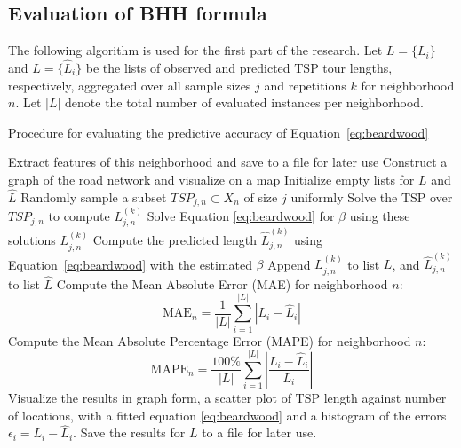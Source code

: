 \subsection{Evaluation of BHH formula}
The following algorithm is used for the first part of the research.
Let \( L = \{L_i\} \) and \( \hat{L} = \{\hat{L}_i\} \) be the lists of observed and predicted TSP tour lengths,
respectively, aggregated over all sample sizes \( j \) and repetitions \( k \) for neighborhood \( n \).
Let \( |L| \) denote the total number of evaluated instances per neighborhood.
\begin{algorithm}[H]
	\caption{Procedure for evaluating the predictive accuracy of Equation~\ref{eq:beardwood}}
	\label{alg:evaluation}
	\begin{algorithmic}[1]
		\State Extract features of this neighborhood and save to a file for later use
		\State Construct a graph of the road network and visualize on a map
		\State Initialize empty lists for \( L \) and \( \hat{L} \)
		\State Randomly sample a subset \( TSP_{j,n} \subset X_n \) of size \( j \) uniformly
		\State Solve the TSP over \( TSP_{j,n} \) to compute \( L_{j,n}^{(k)} \)
		\State Solve Equation \ref{eq:beardwood} for $\beta$ using these solutions \(L_{j,n}^{(k)}\)
		\State Compute the predicted length \( \hat{L}_{j,n}^{(k)} \) using Equation~\ref{eq:beardwood} with the estimated $\beta$
		\State Append \( L_{j,n}^{(k)} \) to list \( L \), and \( \hat{L}_{j,n}^{(k)} \) to list \( \hat{L} \)
		\EndFor
		\EndFor
		\State Compute the Mean Absolute Error (MAE) for neighborhood \( n \):
		\[
			\text{MAE}_n = \frac{1}{|L|} \sum_{i=1}^{|L|} \left| L_i - \hat{L}_i \right|
		\]
		\State Compute the Mean Absolute Percentage Error (MAPE) for neighborhood \( n \):
		\[
			\text{MAPE}_n = \frac{100\%}{|L|} \sum_{i=1}^{|L|} \left| \frac{L_i - \hat{L}_i}{L_i} \right|
		\]
		\State Visualize the results in graph form, a scatter plot of TSP length against number of locations, with
		a fitted equation \ref{eq:beardwood} and a histogram of the errors $\epsilon_i=L_i-\hat{L}_i$.
		\State Save the results for $L$ to a file for later use.
		\EndFor
	\end{algorithmic}
\end{algorithm}
